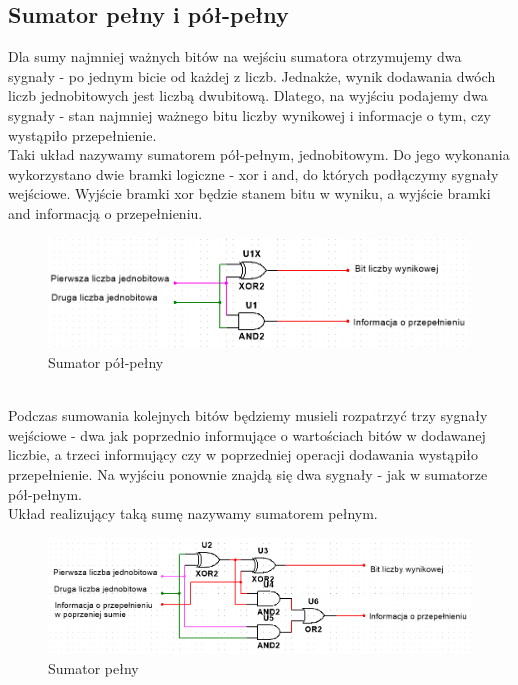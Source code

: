 \documentclass{article}
\begin{document}
        \subsection{Sumator pełny i pół-pełny}
            Dla sumy najmniej ważnych bitów na wejściu sumatora otrzymujemy dwa sygnały - po jednym bicie od każdej z liczb. Jednakże, wynik dodawania dwóch liczb jednobitowych jest liczbą dwubitową. Dlatego, na wyjściu podajemy dwa sygnały - stan najmniej ważnego bitu liczby wynikowej i informacje o tym, czy wystąpiło przepełnienie.\\
            Taki układ nazywamy sumatorem pół-pełnym, jednobitowym. Do jego wykonania wykorzystano dwie bramki logiczne - xor i and, do których podłączymy sygnały wejściowe. Wyjście bramki xor będzie stanem bitu w wyniku, a wyjście bramki and informacją o przepełnieniu. \\
            \begin{figure}[h!]
                \centering
                \includegraphics[width=13cm]{reports/img/Z1A_polpelny.png}
                \caption{Sumator pół-pełny}
            \end{figure}\\
            \FloatBarrier
            Podczas sumowania kolejnych bitów będziemy musieli rozpatrzyć trzy sygnały wejściowe - dwa jak poprzednio informujące o wartościach bitów w dodawanej liczbie, a trzeci informujący czy w poprzedniej operacji dodawania wystąpiło przepełnienie. Na wyjściu ponownie znajdą się dwa sygnały - jak w sumatorze pół-pełnym.\\
            Układ realizujący taką sumę nazywamy sumatorem pełnym.
            \begin{figure}[h!]
                \centering
                \includegraphics[width=13cm]{reports/img/Z1A_pelny.png}
                \caption{Sumator pełny}
            \end{figure}\\
            \FloatBarrier
        
\end{document}
